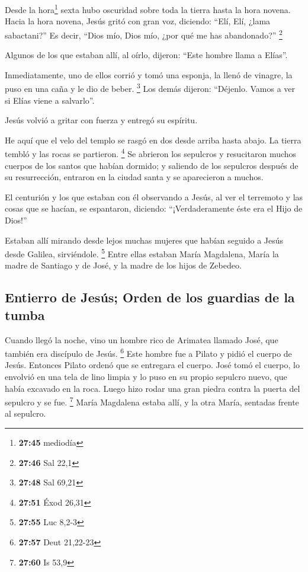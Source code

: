 \begin{paracol}{2}
 Desde la hora\footnote{\textbf{27:45} mediodía} sexta
hubo oscuridad sobre toda la tierra hasta la hora novena.
 Hacia la hora novena, Jesús gritó con gran voz,
diciendo: ``Elí, Elí, ¿lama sabactani?'' Es decir, ``Dios mío, Dios mío,
¿por qué me has abandonado?'' \footnote{\textbf{27:46} Sal 22,1}

 Algunos de los que estaban allí, al oírlo, dijeron:
``Este hombre llama a Elías''.

 Inmediatamente, uno de ellos corrió y tomó una esponja,
la llenó de vinagre, la puso en una caña y le dio de beber. \footnote{\textbf{27:48}
  Sal 69,21}  Los demás dijeron: ``Déjenlo. Vamos a ver
si Elías viene a salvarlo''.

 Jesús volvió a gritar con fuerza y entregó su espíritu.

 He aquí que el velo del templo se rasgó en dos desde
arriba hasta abajo. La tierra tembló y las rocas se partieron.
\footnote{\textbf{27:51} Éxod 26,31}  Se abrieron los
sepulcros y resucitaron muchos cuerpos de los santos que habían dormido;
 y saliendo de los sepulcros después de su resurrección,
entraron en la ciudad santa y se aparecieron a muchos.

 El centurión y los que estaban con él observando a
Jesús, al ver el terremoto y las cosas que se hacían, se espantaron,
diciendo: ``¡Verdaderamente éste era el Hijo de Dios!''

 Estaban allí mirando desde lejos muchas mujeres que
habían seguido a Jesús desde Galilea, sirviéndole. \footnote{\textbf{27:55}
  Luc 8,2-3}  Entre ellas estaban María Magdalena, María
la madre de Santiago y de José, y la madre de los hijos de Zebedeo.

\hypertarget{entierro-de-jesuxfas-orden-de-los-guardias-de-la-tumba}{%
\subsection{Entierro de Jesús; Orden de los guardias de la
tumba}\label{entierro-de-jesuxfas-orden-de-los-guardias-de-la-tumba}}

 Cuando llegó la noche, vino un hombre rico de Arimatea
llamado José, que también era discípulo de Jesús. \footnote{\textbf{27:57}
  Deut 21,22-23}  Este hombre fue a Pilato y pidió el
cuerpo de Jesús. Entonces Pilato ordenó que se entregara el cuerpo.
 José tomó el cuerpo, lo envolvió en una tela de lino
limpia  y lo puso en su propio sepulcro nuevo, que había
excavado en la roca. Luego hizo rodar una gran piedra contra la puerta
del sepulcro y se fue. \footnote{\textbf{27:60} Is 53,9} 
María Magdalena estaba allí, y la otra María, sentadas frente al
sepulcro.


\end{paracol}
